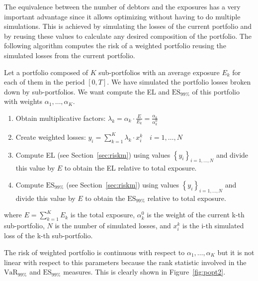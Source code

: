 \documentclass[11pt,fleqn]{book} %
\begin{document}
The equivalence between the number of debtors and the exposures has a very 
important advantage since it allows optimizing without having to do multiple 
simulations. This is achieved by simulating the losses of the current portfolio
and by reusing these values to calculate any desired composition of the 
portfolio. The following algorithm computes the risk of a weighted portfolio 
reusing the simulated losses from the current portfolio.

\begin{algorithm}
	\label{alg:rwp}
	Let a portfolio composed of $K$ sub-portfolios with an average exposure $E_k$ 
	for each of them in the period $[0, T]$. We have simulated the portfolio 
	losses broken down by sub-portfolios. We want compute the EL and 
	$\text{ES}_{99\%}$ of this portfolio with weights $\alpha_1,\dots,\alpha_K$.
	\begin{enumerate}
		\item Obtain multiplicative factors: 
		$\lambda_k = \alpha_k \cdot \frac{E}{E_k} = \frac{\alpha_k}{\alpha_k^0}$
		\item Create weighted losses: $y_i = \displaystyle \sum_{k=1}^K \lambda_k \cdot x_i^k \quad i=1,\dots,N$
		\item Compute EL (see Section~\ref{sec:riskm}) using values $\left\{y_i\right\}_{i=1,\dots,N}$ 
		and divide this value by $E$ to obtain the EL relative to total exposure.
		\item Compute $\text{ES}_{99\%}$ (see Section~\ref{sec:riskm}) using values 
		$\left\{y_i\right\}_{i=1,\dots,N}$ and divide this value by $E$ to obtain the 
		$\text{ES}_{99\%}$ relative to total exposure.
	\end{enumerate}
	where $E = \sum_{k=1}^K E_k$ is the total exposure, $\alpha_k^0$ is the weight
	of the current k-th sub-portfolio, $N$ is the number of simulated losses, and
	$x_i^k$ is the i-th simulated loss of the k-th sub-portfolio.
\end{algorithm}

The risk of weighted portfolio is continuous with respect to $\alpha_1,\dots,\alpha_K$
but it is not linear with respect to this parameters because the rank statistic 
involved in the $\text{VaR}_{99\%}$ and $\text{ES}_{99\%}$ measures. 
This is clearly shown in Figure~\ref{fig:popt2}.
\end{document}
